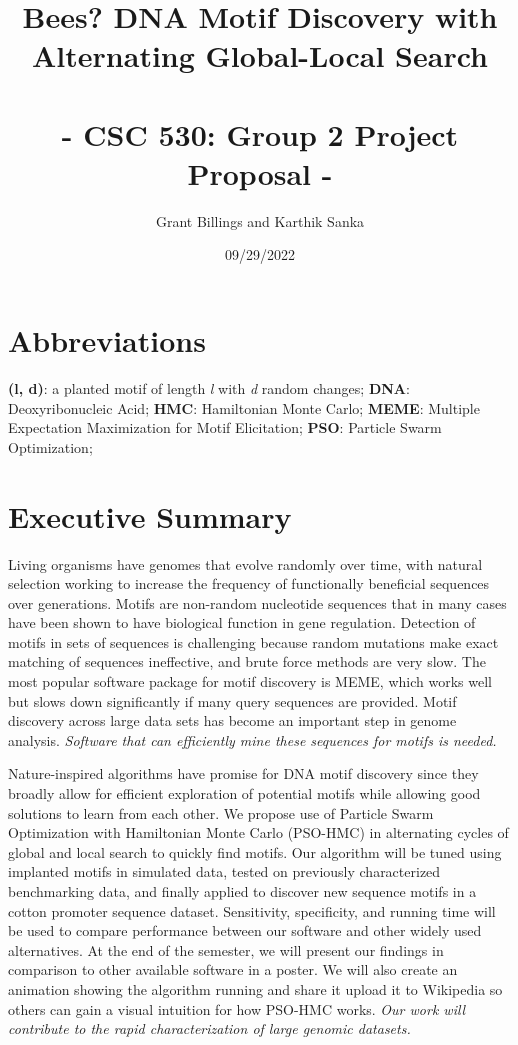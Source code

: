 \documentclass{article}
\title{%
	\Large Bees? DNA Motif Discovery with Alternating Global-Local Search  \\
	\large \; \\ - CSC 530: Group 2 Project Proposal -}
\author{Grant Billings and Karthik Sanka}
\date{09/29/2022}
\begin{document}
\maketitle
\section*{\large{Abbreviations}}
\textbf{(l, d)}: a planted motif of length \textit{l} with \textit{d} random changes; \textbf{DNA}: Deoxyribonucleic Acid; \textbf{HMC}: Hamiltonian Monte Carlo; \textbf{MEME}: Multiple Expectation Maximization for Motif Elicitation; \textbf{PSO}: Particle Swarm Optimization;
\section{Executive Summary}
Living organisms have genomes that evolve randomly over time, with natural selection working to increase the frequency of functionally beneficial sequences over generations. Motifs are non-random nucleotide sequences that in many cases have been shown to have biological function in gene regulation. Detection of motifs in sets of sequences is challenging because random mutations make exact matching of sequences ineffective, and brute force methods are very slow. The most popular software package for motif discovery is MEME, which works well but slows down significantly if many query sequences are provided. Motif discovery across large data sets has become an important step in genome analysis. \textit{Software that can efficiently mine these sequences for motifs is needed.}  
  
Nature-inspired algorithms have promise for DNA motif discovery since they broadly allow for efficient exploration of potential motifs while allowing good solutions to learn from each other. We propose use of Particle Swarm Optimization with Hamiltonian Monte Carlo (PSO-HMC) in alternating cycles of global and local search to quickly find motifs. Our algorithm will be tuned using implanted motifs in simulated data, tested on previously characterized benchmarking data, and finally applied to discover new sequence motifs in a cotton promoter sequence dataset. Sensitivity, specificity, and running time will be used to compare performance between our software and other widely used alternatives. At the end of the semester, we will present our findings in comparison to other available software in a poster. We will also create an animation showing the algorithm running and share it upload it to Wikipedia so others can gain a visual intuition for how PSO-HMC works. \textit{Our work will contribute to the rapid characterization of large genomic datasets.}
\end{document}
